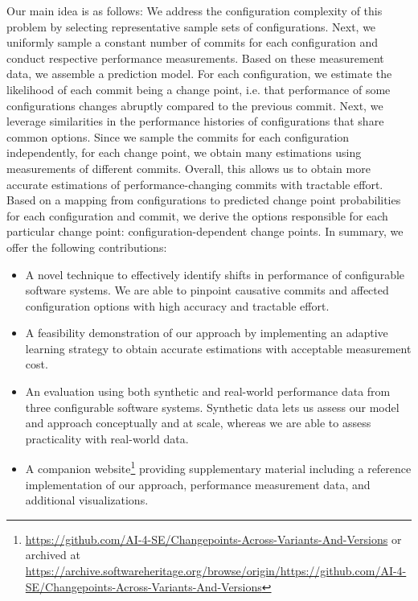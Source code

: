 \documentclass[sigconf]{acmart}
\begin{document}
	Our main idea is as follows: We address the configuration complexity of this problem by selecting representative sample sets of configurations.
	Next, we uniformly sample a constant number of commits for each configuration and conduct respective performance measurements.
	Based on these measurement data, we assemble a prediction model.
	For each configuration, we estimate the likelihood of each commit being a change point, i.e. that performance of some configurations changes abruptly compared to the previous commit.
	Next, we leverage similarities in the performance histories of configurations that share common options.
	Since we sample the commits for each configuration independently, for each change point, we obtain many estimations using measurements of different commits.
	Overall, this allows us to obtain more accurate estimations of performance-changing commits with tractable effort.
	Based on a mapping from configurations to predicted change point probabilities for each configuration and commit, we derive the options responsible for each particular change point: configuration-dependent change points.
	In summary, we offer the following contributions:
	\begin{itemize}
		\item A novel technique to effectively identify shifts in performance of configurable software systems. We are able to pinpoint causative commits and affected configuration options with high accuracy and tractable effort.
		\item A feasibility demonstration of our approach by implementing an adaptive learning strategy to obtain accurate estimations with acceptable measurement cost.
		\item An evaluation using both synthetic and real-world performance data from three configurable software systems. Synthetic data lets us assess our model and approach conceptually and at scale, whereas we are able to assess practicality with real-world data.
		\item A companion website\footnote{\url{https://github.com/AI-4-SE/Changepoints-Across-Variants-And-Versions} or archived at {\color{red}\url{https://archive.softwareheritage.org/browse/origin/https://github.com/AI-4-SE/Changepoints-Across-Variants-And-Versions}}} providing supplementary material including a reference implementation of our approach, performance measurement data, and additional visualizations.
	\end{itemize}
	
\end{document}
